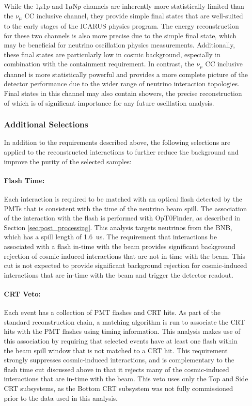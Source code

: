 While the 1$\mu$1$p$ and 1$\mu$N$p$ channels are inherently more statistically limited than the $\nu_\mu$ CC inclusive channel, they provide simple final states that are well-suited to the early stages of the ICARUS physics program. The energy reconstruction for these two channels is also more precise due to the simple final state, which may be beneficial for neutrino oscillation physics measurements. Additionally, these final states are particularly low in cosmic background, especially in combination with the containment requirement. In contrast, the $\nu_\mu$ CC inclusive channel is more statistically powerful and provides a more complete picture of the detector performance due to the wider range of neutrino interaction topologies. Final states in this channel may also contain showers, the precise reconstruction of which is of significant importance for any future oscillation analysis.

\subsubsection{Additional Selections}
\label{sec:additional_selections}

In addition to the requirements described above, the following selections are applied to the reconstructed interactions to further reduce the background and improve the purity of the selected samples:

\paragraph{Flash Time:}
Each interaction is required to be matched with an optical flash detected by the PMTs that is consistent with the time of the neutrino beam spill. The association of the interaction with the flash is performed with OpT0Finder, as described in Section \ref{sec:post_processing}. This analysis targets neutrinos from the BNB, which has a spill length of \qty[mode=text]{1.6}{us}. The requirement that interactions be associated with a flash in-time with the beam provides significant background rejection of cosmic-induced interactions that are not in-time with the beam. This cut is not expected to provide significant background rejection for cosmic-induced interactions that are in-time with the beam and trigger the detector readout.

\paragraph{CRT Veto:}
Each event has a collection of PMT flashes and CRT hits. As part of the standard reconstruction chain, a matching algorithm is run to associate the CRT hits with the PMT flashes using timing information. This analysis makes use of this association by requiring that selected events have at least one flash within the beam spill window that is not matched to a CRT hit. This requirement strongly suppresses cosmic-induced interactions, and is complementary to the flash time cut discussed above in that it rejects many of the cosmic-induced interactions that are in-time with the beam. This veto uses only the Top and Side CRT subsystems, as the Bottom CRT subsystem was not fully commissioned prior to the data used in this analysis.


